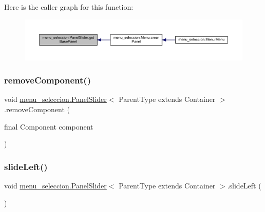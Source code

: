 Here is the caller graph for this function\+:
\nopagebreak
\begin{figure}[H]
\begin{center}
\leavevmode
\includegraphics[width=350pt]{classmenu__seleccion_1_1_panel_slider_a1eb5380941a00a4cfac9d1ebb9d9fc6e_icgraph}
\end{center}
\end{figure}
\mbox{\label{classmenu__seleccion_1_1_panel_slider_a8157aedd9b08d86a16c808caaae13f3f}} 
\subsubsection{\texorpdfstring{remove\+Component()}{removeComponent()}}
{\footnotesize\ttfamily void \mbox{\hyperlink{classmenu__seleccion_1_1_panel_slider}{menu\+\_\+seleccion.\+Panel\+Slider}}$<$ Parent\+Type extends Container $>$.remove\+Component (\begin{DoxyParamCaption}\item[{final Component}]{component }\end{DoxyParamCaption})}

\mbox{\label{classmenu__seleccion_1_1_panel_slider_a8d9bc3adce84f2fe70cec96343e6bde8}} 
\subsubsection{\texorpdfstring{slide\+Left()}{slideLeft()}}
{\footnotesize\ttfamily void \mbox{\hyperlink{classmenu__seleccion_1_1_panel_slider}{menu\+\_\+seleccion.\+Panel\+Slider}}$<$ Parent\+Type extends Container $>$.slide\+Left (\begin{DoxyParamCaption}{ }\end{DoxyParamCaption})}


